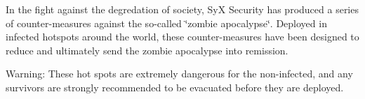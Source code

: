 In the fight against the degredation of society, SyX Security has produced a series of counter-\/measures against the so-\/called \char`\"{}zombie apocalypse\char`\"{}. Deployed in infected hotspots around the world, these counter-\/measures have been designed to reduce and ultimately send the zombie apocalypse into remission.

Warning\+: These hot spots are extremely dangerous for the non-\/infected, and any survivors are strongly recommended to be evacuated before they are deployed. 